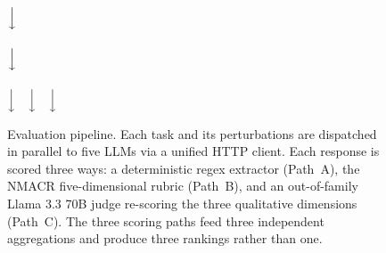 \begin{figure}[H]
  \centering
  \footnotesize
  \setlength{\fboxsep}{4pt}%
  \setlength{\fboxrule}{0.4pt}%
  \hspace{2pt}%
  \\[2pt]
  $\Big\downarrow$\\[2pt]
  \\[2pt]
  $\Big\downarrow$\\[2pt]
  \hspace{2pt}%
  \hspace{2pt}%
  \\[2pt]
  $\Big\downarrow\quad\Big\downarrow\quad\Big\downarrow$\\[2pt]
  \hspace{2pt}%
  \hspace{2pt}%
  \caption{Evaluation pipeline. Each task and its perturbations are
           dispatched in parallel to five LLMs via a unified HTTP
           client. Each response is scored three ways: a
           deterministic regex extractor (Path~A), the NMACR
           five-dimensional rubric (Path~B), and an out-of-family
           Llama 3.3 70B judge re-scoring the three qualitative
           dimensions (Path~C). The three scoring paths feed three
           independent aggregations and produce three rankings
           rather than one.}
  \label{fig:pipeline}
\end{figure}


